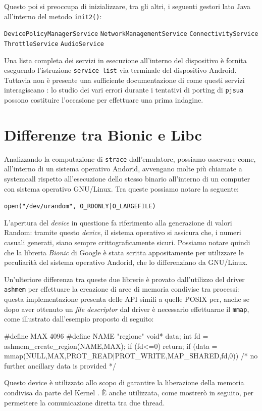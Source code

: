 Questo poi si preoccupa di inizializzare, tra gli altri, i seguenti gestori lato
Java all'interno del metodo \texttt{\small init2()}:
\begin{itemize}
\diam \texttt{\small DevicePolicyManagerService}
\diam \texttt{\small NetworkManagementService}
\diam \texttt{\small ConnectivityService}
\diam \texttt{\small ThrottleService}
\diam \texttt{\small AudioService}
\end{itemize}
Una lista completa dei servizi in esecuzione all'interno del dispositivo è 
fornita eseguendo l'istruzione \texttt{\small service list} via terminale del 
dispositivo Android. Tuttavia non è presente una sufficiente documentazione
di come questi servizi interagiscano \parencite{libro:embedded}: lo studio dei
vari errori durante i tentativi di porting di \texttt{\small pjsua} possono costituire
 l'occasione per effettuare una prima indagine.

\section{Differenze tra Bionic e Libc}\label{sec:diffbilib}
Analizzando la computazione di \texttt{\small strace} dall'emulatore, possiamo osservare
come, all'interno di un sistema operativo Andorid, avvengano molte più chiamate
a systemcall rispetto all'esecuzione dello stesso binario all'interno di un 
computer con sistema operativo GNU/Linux. Tra queste possiamo notare la seguente:
\begin{center}
\texttt{\small open("/dev/urandom", O\_RDONLY|O\_LARGEFILE)}
\end{center}
L'apertura del \textit{device} in questione fa riferimento alla generazione di valori 
Random: tramite questo \textit{device}, il sistema operativo si assicura che, i 
numeri casuali generati, siano sempre crittograficamente sicuri. Possiamo notare
quindi che la libreria \textit{Bionic} di Google è stata scritta appositamente
per utilizzare le peculiarità del sistema operativo Andorid, che lo differenziano
da GNU/Linux.

Un'ulteriore differenza tra queste due librerie è provato dall'utilizzo del
driver \texttt{\small ashmem} per effettuare la creazione di aree di memoria
condivise tra processi: questa implementazione presenta delle API simili a quelle
POSIX per, anche se dopo aver ottenuto un \textit{file descriptor} dal driver
è necessario effettuarne il \texttt{\small mmap}, come illustrato dall'esempio
proposto di seguito:
\begin{clang}
#define MAX 4096
#define NAME "regione"
void* data;
int fd = ashmem_create_region(NAME,MAX);
if (fd<=0) return;
if (data = mmap(NULL,MAX,PROT_READ|PROT_WRITE,MAP_SHARED,fd,0)) {
	/* no further ancillary data is provided */
}
\end{clang}
Questo device è utilizzato allo scopo di garantire la liberazione della memoria
condivisa da parte del Kernel \parencite{site:marakAndroidInternals}. 
È anche utilizzata, come mostrerò in seguito, per permettere la comunicazione 
diretta tra due thread.

